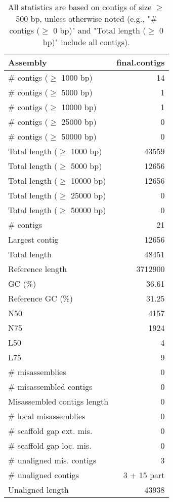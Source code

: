 \documentclass[12pt,a4paper]{article}
\begin{document}
\begin{table}[ht]
\begin{center}
\caption{All statistics are based on contigs of size $\geq$ 500 bp, unless otherwise noted (e.g., "\# contigs ($\geq$ 0 bp)" and "Total length ($\geq$ 0 bp)" include all contigs).}
\begin{tabular}{|l*{1}{|r}|}
\hline
Assembly & final.contigs \\ \hline
\# contigs ($\geq$ 1000 bp) & 14 \\ \hline
\# contigs ($\geq$ 5000 bp) & 1 \\ \hline
\# contigs ($\geq$ 10000 bp) & 1 \\ \hline
\# contigs ($\geq$ 25000 bp) & 0 \\ \hline
\# contigs ($\geq$ 50000 bp) & 0 \\ \hline
Total length ($\geq$ 1000 bp) & 43559 \\ \hline
Total length ($\geq$ 5000 bp) & 12656 \\ \hline
Total length ($\geq$ 10000 bp) & 12656 \\ \hline
Total length ($\geq$ 25000 bp) & 0 \\ \hline
Total length ($\geq$ 50000 bp) & 0 \\ \hline
\# contigs & 21 \\ \hline
Largest contig & 12656 \\ \hline
Total length & 48451 \\ \hline
Reference length & 3712900 \\ \hline
GC (\%) & 36.61 \\ \hline
Reference GC (\%) & 31.25 \\ \hline
N50 & 4157 \\ \hline
N75 & 1924 \\ \hline
L50 & 4 \\ \hline
L75 & 9 \\ \hline
\# misassemblies & 0 \\ \hline
\# misassembled contigs & 0 \\ \hline
Misassembled contigs length & 0 \\ \hline
\# local misassemblies & 0 \\ \hline
\# scaffold gap ext. mis. & 0 \\ \hline
\# scaffold gap loc. mis. & 0 \\ \hline
\# unaligned mis. contigs & 3 \\ \hline
\# unaligned contigs & 3 + 15 part \\ \hline
Unaligned length & 43938 \\ \hline

\end{tabular}
\end{center}
\end{table}
\end{document}
